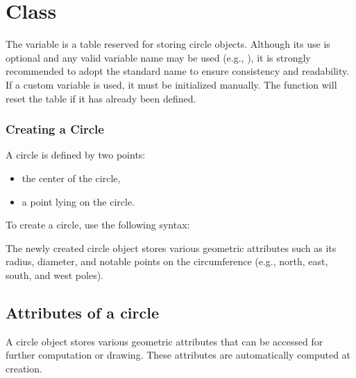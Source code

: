 \newpage
\section{Class }

The  variable is a table reserved for storing circle objects. Although its use is optional and any valid variable name may be used (e.g., ), it is strongly recommended to adopt the standard name  to ensure consistency and readability. If a custom variable is used, it must be initialized manually. The  function will reset the  table if it has already been defined.


\subsubsection{Creating a Circle}
\label{ssub:creating_a_circle}
A circle is defined by two points:
\begin{itemize}
\item the center of the circle,
\item a point lying on the circle.
\end{itemize}
\vspace{0.5em}
\noindent
To create a circle, use the following syntax:
\begin{mybox}
\end{mybox}
\noindent
The newly created circle object stores various geometric attributes such as its radius, diameter, and notable points on the circumference (e.g., north, east, south, and west poles).

\subsection{Attributes of a circle}

A circle object stores various geometric attributes that can be accessed for further computation or drawing. These attributes are automatically computed at creation.

\vspace{1em}

